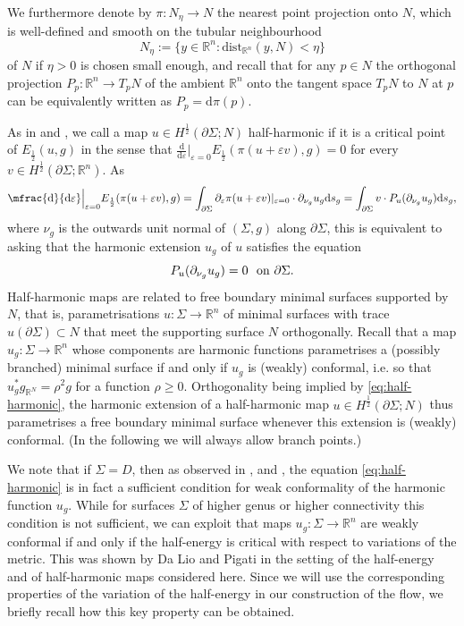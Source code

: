 \documentclass[10pt,reqno]{amsart}
\theoremstyle{plain}
\theoremstyle{definition}
\numberwithin{equation}{section}
\newcommand{\Si}{\Sigma}
\newcommand{\ep}{\varepsilon}
\newcommand{\peps}{\partial_{\eps}}
\newcommand{\R}{\ensuremath{{\mathbb R}}}
\newcommand{\beq}{\begin{equation}}
\newcommand{\eeq}{\end{equation}}
\newcommand{\beqs}{\begin{equation*}}
\newcommand{\eeqs}{\end{equation*}}
\newcommand{\half}{\frac{1}{2}}
\newcommand{\dd}{\mathrm{d}} %
\newcommand{\eps}{\varepsilon}
\newcommand{\dist}{\text{dist}}
\newcommand{\Eh}{E_{\half}} %
\newcommand{\pSi}{{\partial \Sigma}}
\newcommand{\png}{{\partial_{\nu_g}}}
\begin{document}
We furthermore denote by $\pi:N_{\eta}\to N$ the nearest point projection onto $N$, which is well-defined and smooth on the tubular neighbourhood 
\beqs
    N_{\eta}:= \{y \in \R^n:\dist_{\R^n}(y,N) < \eta\}
\eeqs
of $N$ if $\eta>0$ is chosen small enough, and recall that for any $p\in N$ the orthogonal projection $P_p:\R^n\to T_pN$ of the ambient $\R^n$ onto the tangent space $T_pN$ to $N$ at $p$ can be equivalently written as $P_p=\dd\pi(p)$.

As in \cite{DaLio-Riviere} and \cite{DaLio-Pigati}, we call a map $u\in H^\half(\partial \Si; N)$ half-harmonic if it is a critical point of $\Eh(u,g)$ in the sense that $\tfrac{\dd}{\dd \ep}\big|_{\ep=0} E_{\half}(\pi(u+\eps v),g)=0$ for every $v\in H^\half(\pSi; \R^n)$. As 
\beq\label{eq:energy_var-map}
    \mfrac{\dd}{\dd \ep}\Big|_{\ep=0} E_{\half}(\pi(u+\eps v),g)=\int_{\pSi}\peps \pi(u+\eps v) |_{\ep=0} \cdot\png u_g \dd s_g =\int_{\pSi} v\cdot P_u(\png u_g)\dd s_g,
\eeq
where $\nu_g$ is the outwards unit normal of $(\Si,g)$ along $\pSi$, this is equivalent to asking that the harmonic extension $u_g$ of $u$ satisfies the equation 
\beq\label{eq:half-harmonic}
    P_u(\png u_g)=0\ \hbox{ on }\pSi.
\eeq
%
Half-harmonic maps are related to free boundary minimal surfaces supported by $N$, that is, parametrisations $u\colon\Si\to\R^n$ of minimal surfaces with trace $u(\pSi)\subset N$ that meet the supporting surface $N$ orthogonally. Recall that a map $u_g\colon\Si\to\R^n$ whose components are harmonic functions parametrises a (possibly branched) minimal surface if and only if $u_g$ is (weakly) conformal, i.e. so that $u_g^*g_{\R^N}=\rho^2 g$ for a function $\rho\geq 0$. Orthogonality being implied by \eqref{eq:half-harmonic}, the harmonic extension of a half-harmonic map $u\in H^\half(\partial\Si;N)$ thus parametrises a free boundary minimal surface whenever this extension is (weakly) conformal. (In the following we will always allow branch points.)

We note that if $\Si=D$, then as observed in \cite{DaLio-Martinazzi-Riviere}, \cite{DaLio-Pigati} and \cite{Millot-Sire}, the equation \eqref{eq:half-harmonic} is in fact a sufficient condition for weak conformality of the harmonic function $u_g$. While for surfaces $\Si$ of higher genus or higher connectivity this condition is not sufficient, we can exploit that maps $u_g\colon\Si\to\R^n$ are weakly conformal if and only if the half-energy is critical with respect to variations of the metric. This was shown by Da Lio and Pigati \cite{DaLio-Pigati} in the setting of the half-energy and of half-harmonic maps considered here. Since we will use the corresponding properties of the variation of the half-energy in our construction of the flow, we briefly recall how this key property can be obtained. 
\end{document}
